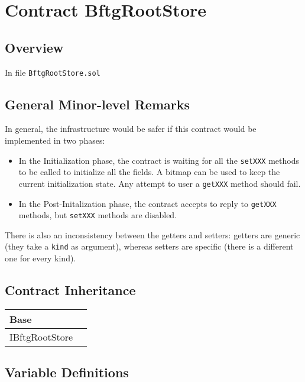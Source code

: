 
\chapter{Contract BftgRootStore}

\minitoc

\section{Overview}


In file {\tt BftgRootStore.sol}

\section{General Minor-level Remarks}

In general, the infrastructure would be safer if this contract would
be implemented in two phases:
\begin{itemize}
\item In the Initialization phase, the contract is waiting for all the
  {\tt setXXX} methods to be called to initialize all the fields. A
  bitmap can be used to keep the current initialization state. Any
  attempt to user a {\tt getXXX} method should fail.
\item In the Post-Initalization phase, the contract accepts to reply
  to {\tt getXXX} methods, but {\tt setXXX} methods are disabled.
\end{itemize}

There is also an inconsistency between the getters and setters:
getters are generic (they take a {\tt kind} as argument), whereas
setters are specific (there is a different one for every kind).

\section{Contract Inheritance}


\noindent\begin{tabular}{|l|p{5cm}|}\hline
Base & \\\hline
IBftgRootStore & \\\hline
\end{tabular}


\section{Variable Definitions}


